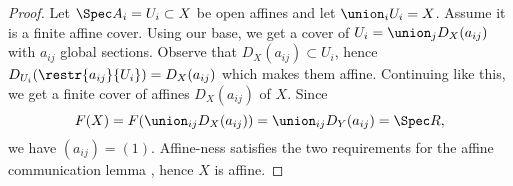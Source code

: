 
\begin{proof}
Let $\Spec A_i = U_i \subset X$ be open affines
and let $\union_i U_i = X$.
Assume it is a finite affine cover.
Using our base, 
we get a cover of $U_i = \union_j D_X(a_{ij})$ 
with $a_{ij}$ global sections.
Observe that $D_X(a_{ij})\subset U_i$, 
hence $D_{U_i}(\restr{a_{ij}}{U_i}) = D_X(a_{ij})$
which makes them affine.
Continuing like this, 
we get a finite cover of affines $D_X(a_{ij})$ of $X$.
Since 
\[ F(X) = F(\union_{ij} D_X(a_{ij})) = \union_{ij} D_Y(a_{ij}) = \Spec R,\]
we have $(a_{ij})=(1)$.
Affine-ness satisfies the two requirements for the affine communication lemma \cite[Ex.2.17]{harts}, 
hence $X$ is affine.
\end{proof}

